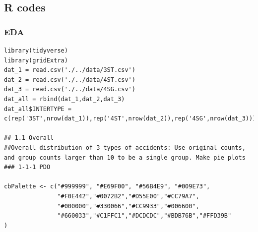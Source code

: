 \documentclass[11pt]{scrartcl} %
\begin{document}
\subsection{R codes}

\subsubsection{EDA}
\lstset{language=R, breaklines=true}
\begin{lstlisting}
library(tidyverse)
library(gridExtra)
dat_1 = read.csv('./../data/3ST.csv')
dat_2 = read.csv('./../data/4ST.csv')
dat_3 = read.csv('./../data/4SG.csv')
dat_all = rbind(dat_1,dat_2,dat_3)
dat_all$INTERTYPE = c(rep('3ST',nrow(dat_1)),rep('4ST',nrow(dat_2)),rep('4SG',nrow(dat_3)))

## 1.1 Overall
##Overall distribution of 3 types of accidents: Use original counts, and group counts larger than 10 to be a single group. Make pie plots
### 1-1-1 PDO

cbPalette <- c("#999999", "#E69F00", "#56B4E9", "#009E73",
               "#F0E442","#0072B2","#D55E00","#CC79A7",
               "#000000","#330066","#CC9933","#006600",
               "#660033","#C1FFC1","#DCDCDC","#BDB76B","#FFD39B"
)


\end{lstlisting}
\end{document}
